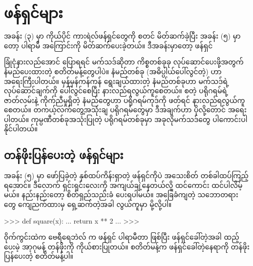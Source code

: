 \chapter{ဖန်ရှင်များ}
အခန်း (၃) မှာ ကိုယ်ပိုင် ကားရဲလ်ဖန်ရှင်တွေကို စတင် မိတ်ဆက်ခဲ့ပြီး အခန်း (၅) မှာတော့ ပါရာမီ  အကြောင်းကို မိတ်ဆက်ပေးခဲ့တယ်။ ဒီအခန်းမှာတော့ ဖန်ရှင်


ခြုံငုံနားလည်အောင် ပြောရရင် မက်သဒ်ဆိုတာ ကိစ္စတစ်ခုခု လုပ်ဆောင်ပေးဖို့အတွက် နံမည်ပေးထားတဲ့ စတိတ်မန့်တွေပါပဲ။ နံမည်တစ်ခု (အဓိပ္ပါယ်ပေါ်လွင်တဲ့) ဟာ အရေးကြီးပါတယ်။ မှန်မှန်ကန်ကန် ရွေးချယ်ထားတဲ့ နံမည်တစ်ခုဟာ မက်သဒ်ရဲ့ လုပ်ဆောင်ချက်ကို ပေါ်လွင်စေပြီး နားလည်ရလွယ်ကူစေတယ်။ \fEn{,} \fEn{,}  စတဲ့ ပရိုဂရမ်ရဲ့ ဇာတ်လမ်းနဲ့ ကိုက်ညီမှုရှိတဲ့ နံမည်တွေဟာ ပရိုဂရမ်ကုဒ်ကို ဖတ်ရင် နားလည်ရလွယ်ကူစေတယ်။ တကယ့်လက်တွေ့အသုံးချ ပရိုဂရမ်တွေမှာ ဒီအချက်ဟာ ပိုလို့တောင် အရေးပါတယ်။ ကုမ္ပဏီတစ်ခုအသုံးပြုတဲ့ ပရိုဂရမ်တစ်ခုမှာ အခုလိုမက်သဒ်တွေ ပါကောင်းပါနိုင်ပါတယ်။

\section{တန်ဖိုးပြန်ပေးတဲ့ ဖန်ရှင်များ}
အခန်း (၅) မှာ ဖော်ပြခဲ့တဲ့ နှစ်ထပ်ကိန်းရှာတဲ့  ဖန်ရှင်ကိုပဲ အသေးစိတ် တစ်ခါထပ်ကြည့်ရအောင်။ ဒီလောက် ရှင်းရှင်းလေးကို အကျယ်ချဲ့နေတယ်လို့ ထင်ကောင်း ထင်ပါလိမ့်မယ်။ နည်းနည်းတော့  စိတ်ရှည်သည်းခံ ပေးရပါမယ်။ အခြေခံကျတဲ့ သဘောတရားတွေ ကျေညက်ထားမှ ရှေ့ဆက်တဲ့အခါ လွယ်\allowbreak ကူမှာ မို့လို့ပါ။  %
%
\begin{codetxt}
>>> def square(x):
...     return x ** 2
...
>>> 
\end{codetxt}
%
ဝိုက်ကွင်းထဲက ဗေရီရေဘဲလ်   က ဖန်ရှင် ပါရာမီတာ  ဖြစ်ပြီး ဖန်ရှင်ခေါ်တဲ့အခါ ထည့်ပေးမဲ့ အာ့ဂုမန့်   တန်ဖိုးကို ကိုယ်စားပြုတယ်။  စတိတ်မန့်က ဖန်ရှင်ခေါ်တဲ့နေရာကို တန်ဖိုးပြန်ပေးတဲ့ စတိတ်မန့်ပါ။ 


